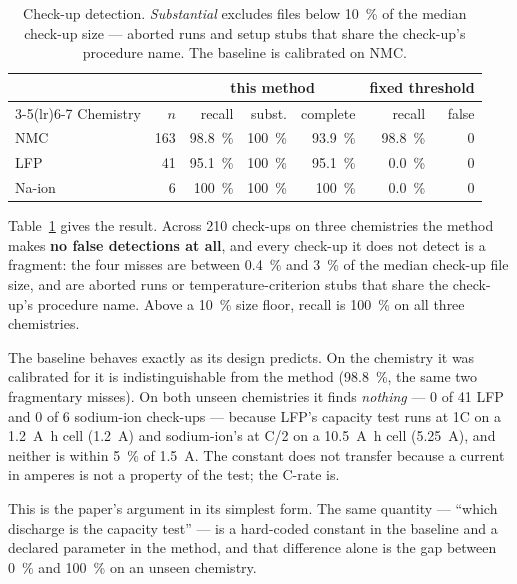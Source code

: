 \documentclass[preprint,3p,number]{elsarticle}
\begin{document}
\begin{table}[t]
\centering
\caption{Check-up detection. \emph{Substantial} excludes files below
\SI{10}{\percent} of the median check-up size --- aborted runs and setup stubs
that share the check-up's procedure name. The baseline is calibrated on NMC.}
\label{tab:recall}
\begin{tabular}{lrrrrrr}
\toprule
& & \multicolumn{3}{c}{this method} & \multicolumn{2}{c}{fixed threshold} \\
\cmidrule(lr){3-5}\cmidrule(lr){6-7}
Chemistry & $n$ & recall & subst. & complete & recall & false \\
\midrule
NMC    & \num{163} & \SI{98.8}{\percent} & \SI{100}{\percent} & \SI{93.9}{\percent} & \SI{98.8}{\percent} & 0 \\
LFP    & \num{41}  & \SI{95.1}{\percent} & \SI{100}{\percent} & \SI{95.1}{\percent} & \SI{0.0}{\percent}  & 0 \\
Na-ion & \num{6}   & \SI{100}{\percent}  & \SI{100}{\percent} & \SI{100}{\percent}  & \SI{0.0}{\percent}  & 0 \\
\bottomrule
\end{tabular}
\end{table}

Table~\ref{tab:recall} gives the result. Across \num{210} check-ups on three
chemistries the method makes \textbf{no false detections at all}, and every
check-up it does not detect is a fragment: the four misses are between
\SI{0.4}{\percent} and \SI{3}{\percent} of the median check-up file size, and
are aborted runs or temperature-criterion stubs that share the check-up's
procedure name. Above a \SI{10}{\percent} size floor, recall is
\SI{100}{\percent} on all three chemistries.

The baseline behaves exactly as its design predicts. On the chemistry it was
calibrated for it is indistinguishable from the method (\SI{98.8}{\percent},
the same two fragmentary misses). On both unseen chemistries it finds
\emph{nothing} --- \num{0} of \num{41} LFP and \num{0} of \num{6} sodium-ion
check-ups --- because LFP's capacity test runs at 1C on a
\SI{1.2}{\ampere\hour} cell (\SI{1.2}{\ampere}) and sodium-ion's at C/2 on a
\SI{10.5}{\ampere\hour} cell (\SI{5.25}{\ampere}), and neither is within
\SI{5}{\percent} of \SI{1.5}{\ampere}. The constant does not transfer because a
current in amperes is not a property of the test; the C-rate is.

This is the paper's argument in its simplest form. The same quantity ---
``which discharge is the capacity test'' --- is a hard-coded constant in the
baseline and a declared parameter in the method, and that difference alone is
the gap between \SI{0}{\percent} and \SI{100}{\percent} on an unseen chemistry.
\end{document}
